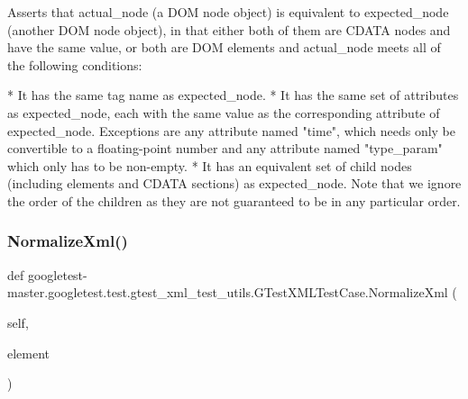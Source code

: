 \begin{DoxyVerb}Asserts that actual_node (a DOM node object) is equivalent to
expected_node (another DOM node object), in that either both of
them are CDATA nodes and have the same value, or both are DOM
elements and actual_node meets all of the following conditions:

*  It has the same tag name as expected_node.
*  It has the same set of attributes as expected_node, each with
   the same value as the corresponding attribute of expected_node.
   Exceptions are any attribute named "time", which needs only be
   convertible to a floating-point number and any attribute named
   "type_param" which only has to be non-empty.
*  It has an equivalent set of child nodes (including elements and
   CDATA sections) as expected_node.  Note that we ignore the
   order of the children as they are not guaranteed to be in any
   particular order.
\end{DoxyVerb}
 \mbox{\label{classgoogletest-master_1_1googletest_1_1test_1_1gtest__xml__test__utils_1_1_g_test_x_m_l_test_case_aeaf548d597d53c5bf3fc123da7ba789e}} 
\subsubsection{\texorpdfstring{NormalizeXml()}{NormalizeXml()}}
{\footnotesize\ttfamily def googletest-\/master.\+googletest.\+test.\+gtest\+\_\+xml\+\_\+test\+\_\+utils.\+G\+Test\+X\+M\+L\+Test\+Case.\+Normalize\+Xml (\begin{DoxyParamCaption}\item[{}]{self,  }\item[{}]{element }\end{DoxyParamCaption})}

